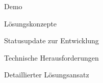

\subtitle{Game Programming}



\slidetitle

\begin{frame}{Demo}

\end{frame}

\begin{frame}{Lösungskonzepte}

\end{frame}

\begin{frame}{Statusupdate zur Entwicklung}

\end{frame}

\begin{frame}{Technische Herausforderungen}

\end{frame}

\begin{frame}{Detaillierter Lösungsansatz}

\end{frame}

%


